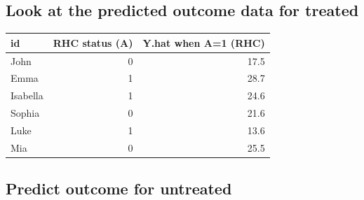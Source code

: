 \documentclass[
]{book}
\newenvironment{Shaded}{\begin{snugshade}}{\end{snugshade}}
\newcommand{\AttributeTok}[1]{\textcolor[rgb]{0.77,0.63,0.00}{#1}}
\newcommand{\ConstantTok}[1]{\textcolor[rgb]{0.00,0.00,0.00}{#1}}
\newcommand{\DecValTok}[1]{\textcolor[rgb]{0.00,0.00,0.81}{#1}}
\newcommand{\FunctionTok}[1]{\textcolor[rgb]{0.00,0.00,0.00}{#1}}
\newcommand{\NormalTok}[1]{#1}
\newcommand{\OtherTok}[1]{\textcolor[rgb]{0.56,0.35,0.01}{#1}}
\newcommand{\SpecialCharTok}[1]{\textcolor[rgb]{0.00,0.00,0.00}{#1}}
\newcommand{\StringTok}[1]{\textcolor[rgb]{0.31,0.60,0.02}{#1}}
\begin{document}
\hypertarget{look-at-the-predicted-outcome-data-for-treated}{%
\subsection{Look at the predicted outcome data for treated}\label{look-at-the-predicted-outcome-data-for-treated}}

\begin{Shaded}
\end{Shaded}

\begin{tabular}{lrr}
\toprule
id & RHC status (A) & Y.hat when A=1 (RHC)\\
\midrule
John & 0 & 17.5\\
Emma & 1 & 28.7\\
Isabella & 1 & 24.6\\
Sophia & 0 & 21.6\\
Luke & 1 & 13.6\\
\addlinespace
Mia & 0 & 25.5\\
\bottomrule
\end{tabular}

\hypertarget{predict-outcome-for-untreated}{%
\subsection{Predict outcome for untreated}\label{predict-outcome-for-untreated}}
\end{document}
